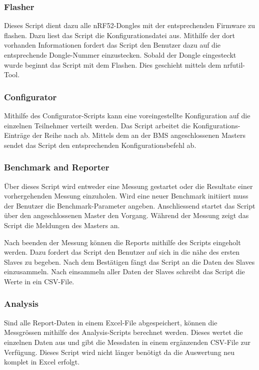 \subsubsection{Flasher}\label{subsubsec:Flash}

Dieses Script dient dazu alle nRF52-Dongles mit der entsprechenden Firmware zu flashen. Dazu liest das Script die Konfigurationsdatei aus. Mithilfe der dort vorhanden Informationen fordert das Script den Benutzer dazu auf die entsprechende Dongle-Nummer einzustecken. Sobald der Dongle eingesteckt wurde beginnt das Script mit dem Flashen. Dies geschieht mittels dem nrfutil-Tool. 

\subsubsection{Configurator}\label{subsubsec:Configurator}

Mithilfe des Configurator-Scripts kann eine voreingestellte Konfiguration auf die einzelnen Teilnehmer verteilt werden. Das Script arbeitet die Konfigurations-Einträge der Reihe nach ab. Mittels dem an der BMS angeschlossenen Masters sendet das Script den entsprechenden Konfigurationsbefehl ab. 

\subsubsection{Benchmark and Reporter}\label{subsubsec:BenchmarkandReporter}

Über dieses Script wird entweder eine Messung gestartet oder die Resultate einer vorhergehenden Messung einzuholen. Wird eine neuer Benchmark initiiert muss der Benutzer die Benchmark-Parameter angeben. Anschliessend startet das Script über den angeschlossenen Master den Vorgang. Während der Messung zeigt das Script die Meldungen des Masters an.

Nach beenden der Messung können die Reports mithilfe des Scripts eingeholt werden. Dazu fordert das Script den Benutzer auf sich in die nähe des ersten Slaves zu begeben. Nach dem Bestätigen fängt das Script an die Daten des Slaves einzusammeln. Nach einsammeln aller Daten der Slaves schreibt das Script die Werte in ein CSV-File. 

\subsubsection{Analysis}\label{subsubsec:Analysis}

Sind alle Report-Daten in einem Excel-File abgespeichert, können die Messgrössen mithilfe des Analysis-Scripts berechnet werden. Dieses wertet die einzelnen Daten aus und gibt die Messdaten in einem ergänzenden CSV-File zur Verfügung. Dieses Script wird nicht länger benötigt da die Auswertung neu komplet in Excel erfolgt. 

